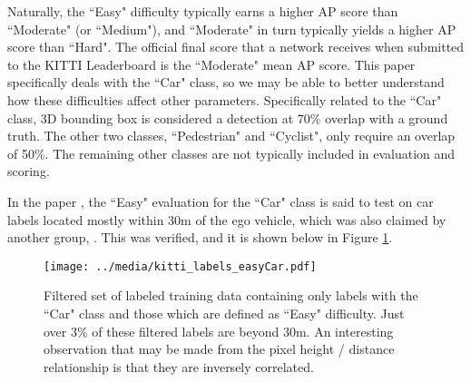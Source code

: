 Naturally, the ``Easy" difficulty typically earns a higher AP score than ``Moderate" (or ``Medium"), and ``Moderate" in turn typically yields a higher AP score than ``Hard". The official final score that a network receives when submitted to the KITTI Leaderboard is the ``Moderate" mean AP score. This paper specifically deals with the ``Car" class, so we may be able to better understand how these difficulties affect other parameters. Specifically related to the ``Car" class, 3D bounding box is considered a detection at 70\% overlap with a ground truth. The other two classes, ``Pedestrian" and ``Cyclist", only require an overlap of 50\%. The remaining other classes are not typically included in evaluation and scoring.

In the paper \cite{wang_pseudo-lidar_2019}, the ``Easy" evaluation for the ``Car" class is said to test on car labels located mostly within 30m of the ego vehicle, which was also claimed by another group, \cite{yang_pixor:_2018}. This was verified, and it is shown below in Figure \ref{kitti_labels_easyCar}.

\begin{figure}[H]
	\centering
	\texttt{[image: ../media/kitti\_labels\_easyCar.pdf]}
	\caption{Filtered set of labeled training data containing only labels with the ``Car" class and those which are defined as ``Easy" difficulty. Just over 3\% of these filtered labels are beyond 30m. An interesting observation that may be made from the pixel height / distance relationship is that they are inversely correlated.}
	\label{kitti_labels_easyCar}
\end{figure}

